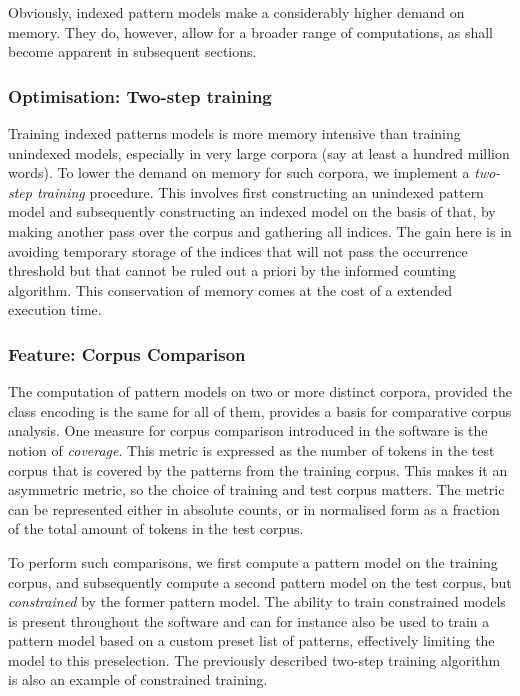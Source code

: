 \documentclass[a4paper,12pt]{article}
\begin{document}
Obviously, indexed pattern models make a considerably higher demand on memory.
They do, however, allow for a broader range of computations, as shall become
apparent in subsequent sections.

\subsubsection{Optimisation: Two-step training}

Training indexed patterns models is more memory intensive than training
unindexed models, especially in very large corpora (say at least a hundred
million words). To lower the demand on memory for such corpora, we implement a
\emph{two-step training} procedure. This involves first constructing an
unindexed pattern model and subsequently constructing an indexed model on the
basis of that, by making another pass over the corpus and gathering all
indices. The gain here is in avoiding temporary storage of the indices that
will not pass the occurrence threshold but that cannot be ruled out a priori by the
informed counting algorithm.  This conservation of memory comes at the cost of
a extended execution time.

\subsubsection{Feature: Corpus Comparison}

The computation of pattern models on two or more distinct corpora, provided the
class encoding is the same for all of them, provides a basis for comparative
corpus analysis. One measure for corpus comparison introduced in the software
is the notion of \emph{coverage}. This metric is expressed as the number of
tokens in the test corpus that is covered by the patterns from the training
corpus. This makes it an asymmetric metric, so the choice of training and test corpus
matters.  The metric can be represented either in absolute counts, or in
normalised form as a fraction of the total amount of tokens in the test corpus.

To perform such comparisons, we first compute a pattern model on the training
corpus, and subsequently compute a second pattern model on the test corpus, but
\emph{constrained} by the former pattern model. The ability to train
constrained models is present throughout the software and can for instance also
be used to train a pattern model based on a custom preset list of patterns,
effectively limiting the model to this preselection. The previously described
two-step training algorithm is also an example of constrained training.
\end{document}
